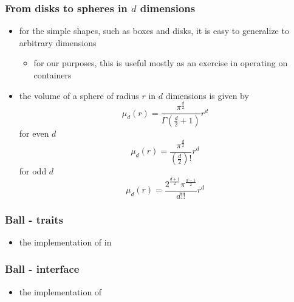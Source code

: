 
\begin{frame}
%
  \frametitle{From disks to spheres in $d$ dimensions}
%
  \begin{itemize}
%
  \item for the simple shapes, such as boxes and disks, it is easy to generalize to arbitrary
    dimensions
    \begin{itemize}
    \item for our purposes, this is useful mostly as an exercise in operating on containers
    \end{itemize}
%
  \item the volume of a sphere of radius $r$ in $d$ dimensions is given by
%
    \[
    \mu_{d}(r) = \frac{\pi^{\frac{d}{2}}}{\Gamma\left(\frac{d}{2} + 1\right)} r^{d}
    \]
%
    for even $d$
    \[
    \mu_{d}(r) = \frac{\pi^{\frac{d}{2}}}{\left(\frac{d}{2}\right)!} r^{d}
    \]
%
    for odd $d$
    \[
    \mu_{d}(r) = \frac{2^{\frac{d+1}{2}} \pi^{\frac{d-1}{2}}}{d!!} r^{d}
    \]
%
  \end{itemize}
%
\end{frame}

\begin{frame}
%
  \frametitle{Ball - traits}
%
  \begin{itemize}
%
  \item the implementation of  in 
%
  \end{itemize}
%
\end{frame}

\begin{frame}
%
  \frametitle{Ball - interface}
%
  \begin{itemize}
%
  \item the implementation of 
%
  \end{itemize}
%
\end{frame}

